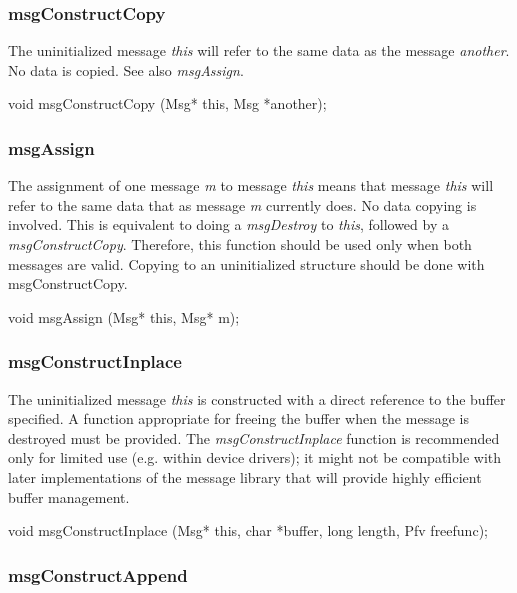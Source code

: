 \subsubsection{msgConstructCopy}

The uninitialized message {\em this} will refer to the same data as
the message {\em another}.  No data is copied.  See also {\em
msgAssign}.

\medskip

{\sem void} {\bold msgConstructCopy} ({\sem Msg*} {\caps this}, {\sem Msg} *{\caps another});

\subsubsection{msgAssign}

The assignment of one message {\em m} to message {\em this} means that
message {\em this} will refer to the same data that as message {\em m}
currently does.  No data copying is involved.  This is equivalent to
doing a {\em msgDestroy} to {\em this}, followed by a {\em
msgConstructCopy}.  Therefore, this function should be used only when
both messages are valid.  Copying to an uninitialized structure should
be done with msgConstructCopy.
\medskip

{\sem void} {\bold msgAssign} ({\sem Msg*} {\caps this}, {\sem Msg*} {\caps m});
\medskip

\subsubsection{msgConstructInplace}

The uninitialized message {\em this} is constructed with a direct
reference to the buffer specified.  A function appropriate for freeing
the buffer when the message is destroyed must be provided.  The {\em
msgConstructInplace} function is recommended only for limited use
(e.g. within device drivers); it might not be compatible with later
implementations of the message library that will provide highly
efficient buffer management.

\medskip

{\sem void} {\bold msgConstructInplace} ({\sem Msg*} {\caps this},
	{\sem char} *{\caps buffer},
	{\sem long} {\caps length},
	{\sem Pfv} {\caps freefunc});

\subsubsection{msgConstructAppend}

